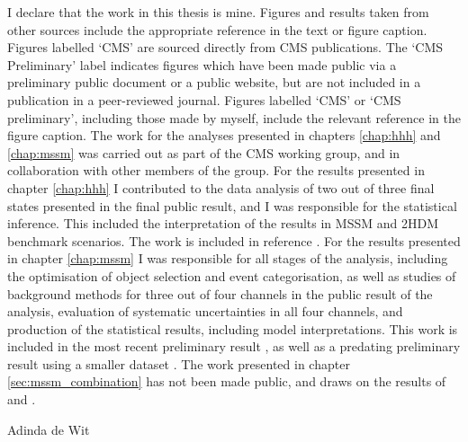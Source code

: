 \begin{declaration}
  \vspace*{1cm}
  I declare that the work in this thesis is mine. Figures and results taken from other sources
include the appropriate reference in the text or figure caption. Figures labelled `CMS' are sourced
directly from CMS publications. The `CMS Preliminary' label indicates figures which
have been made public via a preliminary public document or a public website, but are not
included in a publication in a peer-reviewed journal. Figures labelled `CMS' or `CMS preliminary', 
including those made by myself, include the relevant reference in the figure caption.
The work for the analyses presented in chapters \ref{chap:hhh} and \ref{chap:mssm} was 
carried out as part of the CMS \Htotautau working group, and in collaboration with other members of the group.
For the results presented in chapter \ref{chap:hhh} I contributed to the data analysis of two out of three
final states presented in the final public result, and I 
was responsible for the statistical inference. This included
the interpretation of the results in MSSM and 2HDM benchmark scenarios. The 
work is included in reference \cite{CMS-HIG-14-034}. For the results presented in chapter \ref{chap:mssm}
I was responsible for all stages of the analysis, including the optimisation
of object selection and event categorisation, as well as studies of background
methods for three out of four channels in the public result of the analysis,
evaluation of systematic uncertainties in all four channels, and production of the statistical
results, including model interpretations. This work is included in the most recent
preliminary result \cite{CMS-PAS-HIG-16-037}, as well as a predating preliminary
result using a smaller dataset \cite{CMS-PAS-HIG-16-006}.
The work presented in chapter \ref{sec:mssm_combination} has
not been made public, and draws on the results of \cite{CMS-PAS-HIG-16-037} and \cite{CMS-PAS-HIG-16-006}.

  \begin{flushright}
  Adinda de Wit
  \end{flushright}
\end{declaration}




\tableofcontents
\listoffigures
\listoftables




\thispagestyle{empty}
